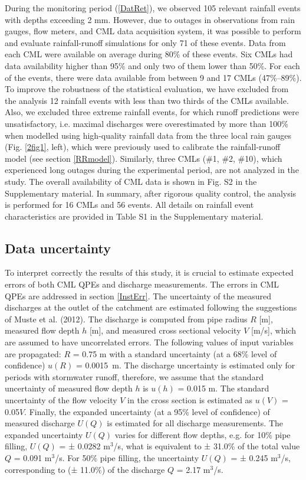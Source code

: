 \documentclass{ctuthesis}\usepackage[]{graphicx}\usepackage[]{color}
\begin{document}
During the monitoring period (\ref{DatRet}), we observed 105 relevant rainfall events with depths exceeding 2 mm. However, due to outages in observations from rain gauges, flow meters, and CML data acquisition system, it was possible to perform and evaluate rainfall-runoff simulations for only 71 of these events. Data from each CML were available on average during 80\% of these events. Six CMLs had data availability higher than 95\% and only two of them lower than 50\%. For each of the events, there were data available from between 9 and 17 CMLs (47\%--89\%). To improve the robustness of the statistical evaluation, we have excluded from the analysis 12 rainfall events with less than two thirds of the CMLs available. Also, we excluded three extreme rainfall events, for which runoff predictions were unsatisfactory, i.e. maximal discharges were overestimated by more than 100\% when modelled using high-quality rainfall data from the three local rain gauges (Fig. \ref{2fig1}, left), which were previously used to calibrate the rainfall-runoff model (see section \ref{RRmodel}). Similarly, three CMLs (\#1, \#2, \#10), which experienced long outages during the experimental period, are not analyzed in the study. The overall availability of CML data is shown in Fig. S2 in the Supplementary material. In summary, after rigorous quality control, the analysis is performed for 16 CMLs and 56 events. All details on rainfall event characteristics are provided in Table S1 in the Supplementary material.


\subsection{Data uncertainty}

To interpret correctly the results of this study, it is crucial to estimate expected errors of both CML QPEs and discharge measurements. The errors in CML QPEs are addressed in section \ref{InstErr}. The uncertainty of the measured discharges at the outlet of the catchment are estimated following the suggestions of Muste et al. (2012). The discharge is computed from pipe radius $R$ [m], measured flow depth $h$ [m], and measured cross sectional velocity $V$ [m/s], which are assumed to have uncorrelated errors. The following values of input variables are propagated: $R$ = 0.75 m with a standard uncertainty (at a 68\% level of confidence) $u(R)$ = 0.0015~m. The discharge uncertainty is estimated only for periods with stormwater runoff, therefore, we assume that the standard uncertainty of measured flow depth $h$ is $u(h)$ = 0.015 m. The standard uncertainty of the flow velocity $V$ in the cross section is estimated as $u(V)$ = 0.05$V$. Finally, the expanded uncertainty (at a 95\% level of confidence) of measured discharge $U(Q)$ is estimated for all discharge measurements. The expanded uncertainty $U(Q)$ varies for different flow depths, e.g. for 10\% pipe filling, $U(Q)$ = ± 0.0282 m$^3$/s, what is equivalent to ± 31.0\% of the total value $Q$ = 0.091 m$^3$/s. For 50\% pipe filling, the uncertainty $U(Q)$ = ± 0.245 m$^3$/s, corresponding to (± 11.0\%) of the discharge $Q$ = 2.17 m$^3$/s.
\end{document}
